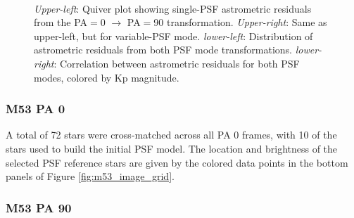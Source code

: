 \documentclass[]{spie}  %
\begin{document}
\begin{figure}[!h]
  \centering
  \\
  \hspace{-1cm}
  \caption{\textit{Upper-left}: Quiver plot showing single-PSF astrometric residuals from the PA$=$0 $\rightarrow$ PA$=$90 transformation. \textit{Upper-right}: Same as upper-left, but for variable-PSF mode. \textit{lower-left}: Distribution of astrometric residuals from both PSF mode transformations. \textit{lower-right}: Correlation between astrometric residuals for both PSF modes, colored by Kp magnitude.} \label{fig:m53_PA_compare}
\end{figure}

\subsubsection{M53 PA 0} \label{sec:result-m53-pa0}
A total of 72 stars were cross-matched across all PA 0 frames, with 10 of the stars used to build the initial PSF model. The location and brightness of the selected PSF reference stars are given by the colored data points in the bottom panels of Figure \ref{fig:m53_image_grid}.

\subsubsection{M53 PA 90} \label{sec:result-m53-pa90}
\end{document}
